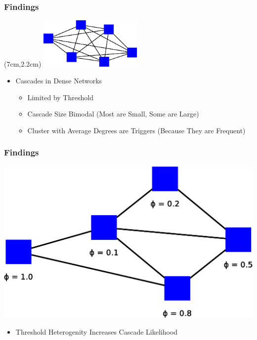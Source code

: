 \documentclass[slidestop,usenames,dvipsnames]{beamer}
\newcommand{\fitem}{\pause\vfill\item}
\newcommand{\gitem}{\vfill\item}
\begin{document}
\begin{frame}
    \frametitle{Findings}
    \begin{textblock*}{5cm}(7cm,2.2cm)
        \includegraphics[width=5cm]{img/dense}
    \end{textblock*}
    \begin{itemize}
        \gitem Cascades in Dense Networks
        \begin{itemize}
            \fitem Limited by Threshold
            \fitem Cascade Size Bimodal (Most are Small, Some are Large)
            \fitem Cluster with Average Degrees are Triggers (Because They are Frequent)
        \end{itemize}
    \end{itemize}
    \vfill
\end{frame}

\begin{frame}
  \frametitle{Findings}
  \vfill
  \center\includegraphics[height=0.4\textheight]{img/threshold}
  \begin{itemize}
    \gitem Threshold Heterogenity Increases Cascade Likelihood
  \end{itemize}
  \vfill
\end{frame}
\end{document}
